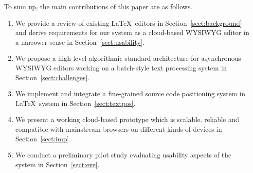 \documentclass[sigconf]{acmart}
\begin{document}
To sum up, the main contributions of this paper are as follows.
\begin{enumerate}
\item We provide a review of existing \LaTeX\ editors in Section~\ref{sect:background} and derive requirements for our system as a cloud-based WYSIWYG editor in a narrower sense in Section~\ref{sect:usability}.
\item We propose a high-level algorithmic standard architecture for asynchronous WYSIWYG editors working on a batch-style text processing system in Section~\ref{sect:challenges}.
\item We implement and integrate a fine-grained source code positioning system in \LaTeX\ system in Section~\ref{sect:textpos}.
\item We present a working cloud-based prototype which is scalable, reliable and compatible with mainstream browsers on different kinds of devices in Section~\ref{sect:imp}. 
\item We conduct a preliminary pilot study evaluating usability aspects of the system in Section~\ref{sect:eve}.
\end{enumerate}






\end{document}
